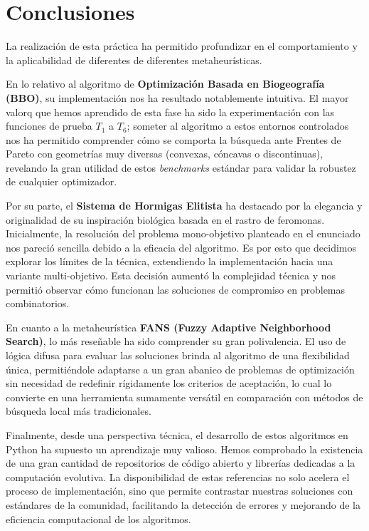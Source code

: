 \section{Conclusiones}

La realización de esta práctica ha permitido profundizar en el comportamiento y la aplicabilidad de diferentes de diferentes metaheurísticas.

En lo relativo al algoritmo de \textbf{Optimización Basada en Biogeografía (BBO)}, su implementación nos ha resultado notablemente intuitiva. El mayor valorq que hemos aprendido de esta fase ha sido la experimentación con las funciones de prueba $T_1$ a $T_6$; someter al algoritmo a estos entornos controlados nos ha permitido comprender cómo se comporta la búsqueda ante Frentes de Pareto con geometrías muy diversas (convexas, cóncavas o discontinuas), revelando la gran utilidad de estos \textit{benchmarks} estándar para validar la robustez de cualquier optimizador.

Por su parte, el \textbf{Sistema de Hormigas Elitista} ha destacado por la elegancia y originalidad de su inspiración biológica basada en el rastro de feromonas. Inicialmente, la resolución del problema mono-objetivo planteado en el enunciado nos pareció sencilla debido a la eficacia del algoritmo. Es por esto que decidimos explorar los límites de la técnica, extendiendo la implementación hacia una variante multi-objetivo. Esta decisión aumentó la complejidad técnica y nos permitió observar cómo funcionan las soluciones de compromiso en problemas combinatorios.

En cuanto a la metaheurística \textbf{FANS (Fuzzy Adaptive Neighborhood Search)}, lo más reseñable ha sido comprender su gran polivalencia. El uso de lógica difusa para evaluar las soluciones brinda al algoritmo de una flexibilidad única, permitiéndole adaptarse a un gran abanico de problemas de optimización sin necesidad de redefinir rígidamente los criterios de aceptación, lo cual lo convierte en una herramienta sumamente versátil en comparación con métodos de búsqueda local más tradicionales.

Finalmente, desde una perspectiva técnica, el desarrollo de estos algoritmos en Python ha supuesto un aprendizaje muy valioso. Hemos comprobado la existencia de una gran cantidad de repositorios de código abierto y librerías dedicadas a la computación evolutiva. La disponibilidad de estas referencias no solo acelera el proceso de implementación, sino que permite contrastar nuestras soluciones con estándares de la comunidad, facilitando la detección de errores y mejorando de la eficiencia computacional de los algoritmos.
